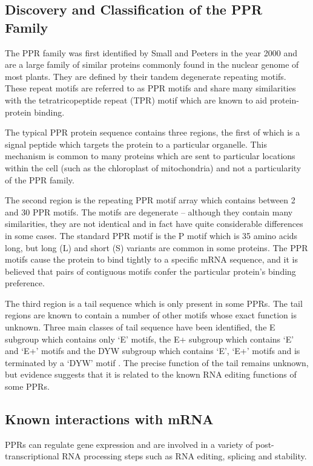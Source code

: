 \subsection{Discovery and Classification of the PPR Family}

The PPR family was first identified by Small and Peeters in the year 2000
and are a large family of similar proteins commonly found in the nuclear
genome of most plants. 
They are defined by their tandem degenerate repeating motifs\cite{Small2000}.
These repeat motifs are referred to as PPR motifs and share many similarities
with the tetratricopeptide repeat (TPR) motif which are known to aid
protein-protein binding.

The typical PPR protein sequence contains three regions, the first of
which is a signal peptide which targets the protein to a particular organelle.
This mechanism is common to many proteins which are sent to particular
locations within the cell (such as the chloroplast of mitochondria) and not a
particularity of the PPR family. 

The second region is the repeating PPR motif array which contains between 2 and
30 PPR motifs.
The motifs are degenerate -- although they contain many similarities, they are
not identical and in fact have quite considerable differences in some cases.
The standard PPR motif is the P motif which is 35 amino acids long, 
but long (L) and short (S) variants are common in some proteins.
The PPR motifs cause the protein to bind tightly to a specific mRNA sequence,
and it is believed that pairs of contiguous motifs confer the particular
protein's binding preference\cite{Kobayashi2012}.

The third region is a tail sequence which is only present in some PPRs.
The tail regions are known to contain a number of other motifs whose exact
function is unknown.
Three main classes of tail sequence have been identified, 
the E subgroup which contains
only `E' motifs, the E+ subgroup which contains `E' and `E+' motifs and the DYW
subgroup which contains `E', `E+' motifs and is terminated by a `DYW' motif
\cite{Lurin2004}.
The precise function of the tail remains unknown, but evidence suggests that it
is related to the known RNA editing functions of some PPRs\cite{Yagi2013a}.

\subsection{Known interactions with mRNA}

PPRs can regulate gene expression and are involved in a variety of
post-transcriptional RNA processing steps such as RNA editing, splicing and
stability\cite{Schmitz-Linneweber2008,Nakamura2012}.

